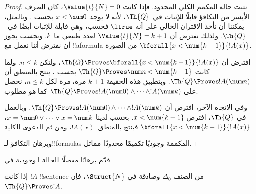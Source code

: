 \documentclass[../../../include/open-logic-section]{subfiles}
\begin{document}
\begin{proof}
    نثبت حالة المكمم الكلي المحدود. فإذا كانت $\Value{t}{N}=0$،
    كان الطرف الأيسر من التكافؤ قابلًا للإثبات في~$\Th{Q}$، لأنه
    لا يوجد $x<\num 0$ بحسب
    . وبالمثل، يمكننا أن نأخذ
    الاقتران الخالي على أنه $\ltrue$ فحسب، وهي قابلة للإثبات أيضًا
    في~$\Th{Q}$.
    ولذلك نفترض أن $\Value{t}{N}=k+1$ لعدد طبيعي ما~$k$. وبحسب
     يجوز أن نفترض أننا نعمل مع
    !!a{formula} من الصورة $\bforall{x<\num{k+1}}{!A(x)}$.
    
    افترض أن
    $\Th{Q}\Proves\bforall{x<\num{k+1}}{!A(x)}$، ولتكن
    $n\leq k$. ولما كانت
    $\Th{Q}\Proves\num n<\num{k+1}$ بحسب
    ، ينتج بالمنطق أن
    $\Th{Q}\Proves !A(\num n)$. وبتطبيق هذه الحقيقة $k+1$ مرة،
    مرة لكل $n\leq k$، نحصل على
    $\Th{Q}\Proves !A(\num 0)\land\dots\land !A(\num k)$ كما
    هو مطلوب.
    
    وفي الاتجاه الآخر، افترض أن
    $\Th{Q}\Proves !A(\num 0)\land\dots\land !A(\num k)$.
    وبالعمل في $\Th{Q}$، افترض $x<\num{k+1}$. بحسب
     لدينا
    $x=\num 0\lor\dots\lor x=\num k$، فينتج بالمنطق~$!A(x)$،
    ومن ثم الدعوى الكلية
    $\bforall{x<\num{k+1}}{!A(x)}$.
    
    وبرهان التكافؤ لـ!!{formula}s المكممة وجوديًا تكميمًا محدودًا
    مماثل.
\end{proof}

\begin{prob}
قدّم برهانًا مفصلًا للحالة الوجودية في
.
\end{prob}

\begin{lem}
إذا كانت $!A$ !!{sentence} من الصنف $\Delta_0$ وصادقة في
$\Struct{N}$، فإن $\Th{Q}\Proves !A$.
\end{lem}
\end{document}
